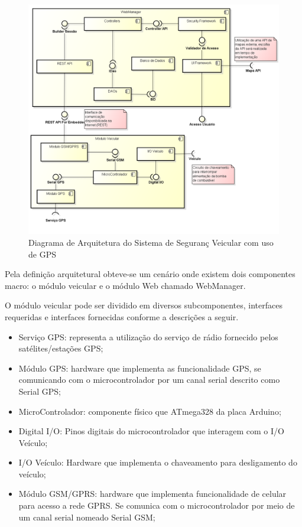 \begin{figure}[!htb]
\centering
\includegraphics[width=\textwidth]{figures/4_arquitetural.png}
\caption{Diagrama de Arquitetura do Sistema de Seguran\c{c} Veicular com uso de GPS}
\label{fig:arquitetura}
\end{figure}


Pela definição arquitetural obteve-se um cenário onde existem dois componentes macro: o módulo veicular e o módulo Web chamado WebManager.

O módulo veicular pode ser dividido em diversos subcomponentes, interfaces requeridas e interfaces fornecidas conforme a descrições a seguir.

\begin{itemize}
	\item Serviço GPS: representa a utilização do serviço de rádio fornecido pelos satélites/estações GPS;
	\item Módulo GPS: hardware que implementa as funcionalidade GPS, se comunicando com o microcontrolador por um canal serial descrito como Serial GPS;
	\item MicroControlador: componente físico que ATmega328 da placa Arduino;
	\item Digital I/O: Pinos digitais do microcontrolador que interagem com o I/O Veículo;
	\item I/O Veículo: Hardware que implementa o chaveamento para desligamento do veículo;
	\item Módulo GSM/GPRS: hardware que implementa funcionalidade de celular para acesso a rede GPRS. Se comunica com o microcontrolador por meio de um canal serial nomeado Serial GSM;
\end{itemize}

